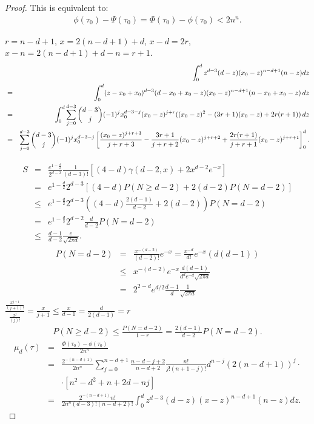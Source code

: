 \documentclass[10pt,a4paper]{amsart}
\def\dif{{\rm d}}
\begin{document}
\begin{proof}
    This is equivalent to:
    \begin{eqnarray*}
      \phi(\tau_0)-\Psi(\tau_0)=  \Phi(\tau_0)-\phi(\tau_0)< 2n^n. 
    \end{eqnarray*}
  
$r=n-d+1$, $x=2(n-d+1)+d$, $x-d=2r$, $x-n=2(n-d+1)+d-n=r+1$. 
\begin{eqnarray*}
&&\int_0^d z^{d-3}(d-z)(x_0-z)^{n-d+1}(n-z) \dif z\\
&=&\int_0^d (z-x_0+x_0)^{d-3}(d-x_0+x_0-z)(x_0-z)^{n-d+1}(n-x_0+x_0-z)\,  \dif z\\
&=&\int_0^d \sum_{j=0}^{d-3}\binom{d-3}{j}(-1)^j x_0^{d-3-j}(x_0-z)^{j+r} ((x_0-z)^2-(3r+1)(x_0-z)+2r(r+1))\, \dif z\\
&=&\sum_{j=0}^{d-3}\binom{d-3}{j}(-1)^j x_0^{d-3-j}\left[\frac{(x_0-z)^{j+r+3}}{j+r+3}-\frac{3r+1}{j+r+2}(x_0-z)^{j+r+2}+\frac{2r(r+1)}{j+r+1}(x_0-z)^{j+r+1}\right]_0^d. 
\end{eqnarray*}


\begin{eqnarray*}
    S&=&\frac{e^{1-\frac{d}{2}}}{2^{d-3}}\frac{1}{(d-3)!}\left[(4-d)\gamma(d-2, x)+2 x^{d-2}e^{-x}\right]\\
    &=&e^{1-\frac{d}{2}}2^{d-3}\left[(4-d)P(N\ge d-2)+2(d-2)P(N=d-2)\right]\\
    &\le& e^{1-\frac{d}{2}}2^{d-3}\left((4-d)\frac{2(d-1)}{d-2}+2(d-2)\right)P(N=d-2)\\
    &=&e^{1-\frac{d}{2}}2^{d-2}\frac{d}{d-2}P(N=d-2)\\
    &\le& \frac{d-1}{d-2}\frac{e}{\sqrt{2\pi d}}.
\end{eqnarray*}
\begin{eqnarray*}
    P(N=d-2)&=&\frac{x^{-(d-2)}}{(d-2)!}e^{-x}=\frac{x^{-d}}{d!}e^{-x}(d(d-1))\\
    &\le& x^{-(d-2)}e^{-x}\frac{d(d-1)}{d^d e^{-d}\sqrt{2\pi d}}\\
    &=& 2^{2-d} e^{d/2} \frac{d-1}{d}\frac{1}{\sqrt{2\pi d}}
\end{eqnarray*}
$\frac{\frac{x^{j+1}}{(j+1)!}}{\frac{x^{j}}{(j)!}}=\frac{x}{j+1}\le \frac{x}{d-1}=\frac{d}{2(d-1)}=r$
\begin{eqnarray*}
   P(N\ge d-2)\le \frac{P(N=d-2)}{1-r}=\frac{2(d-1)}{d-2}P(N=d-2). 
\end{eqnarray*}
\begin{eqnarray*}
  \mu_d(\tau) &=& \frac{\Phi(\tau_0)-\phi(\tau_0)}{2n^n}\\
   &=&\frac{2^{-(n-d+1)}}{2n^n}\sum_{j=0}^{n-d+1}\frac{n-d-j+2}{n-d+2}\frac{n!}{j!(n+1-j)!}d^{n-j}(2(n-d+1))^j\cdot\\
   &&\cdot [n^2-d^2+n+2d-nj]\\
   &=&\frac{2^{-(n-d+1)}n!}{2 n^n (d-3)!(n-d+2)!}\int_0^d z^{d-3}(d-z)(x-z)^{n-d+1}(n-z)dz.
\end{eqnarray*}


\end{proof}
\end{document}
